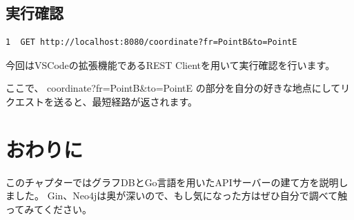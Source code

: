 \subsection{実行確認}

\begin{tcolorbox}[title=sample.http]
\begin{verbatim}
1  GET http://localhost:8080/coordinate?fr=PointB&to=PointE
\end{verbatim}
\end{tcolorbox}
今回はVSCodeの拡張機能であるREST Clientを用いて実行確認を行います。

ここで、 coordinate?fr=PointB\&to=PointE の部分を自分の好きな地点にしてリクエストを送ると、最短経路が返されます。

\section{おわりに}
このチャプターではグラフDBとGo言語を用いたAPIサーバーの建て方を説明しました。
Gin、Neo4jは奥が深いので、もし気になった方はぜひ自分で調べて触ってみてください。
